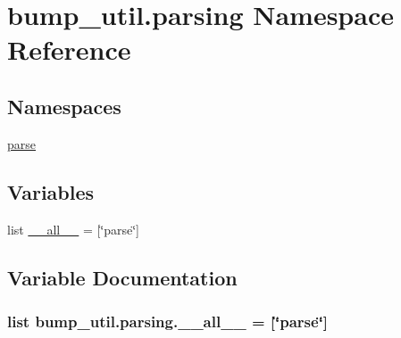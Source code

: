 \hypertarget{namespacebump__util_1_1parsing}{}\section{bump\+\_\+util.\+parsing Namespace Reference}
\label{namespacebump__util_1_1parsing}
\subsection*{Namespaces}
\begin{DoxyCompactItemize}
\item 
 \hyperlink{namespacebump__util_1_1parsing_1_1parse}{parse}
\end{DoxyCompactItemize}
\subsection*{Variables}
\begin{DoxyCompactItemize}
\item 
list \hyperlink{namespacebump__util_1_1parsing_a7eaae042e83d067272095eba9663a230}{\+\_\+\+\_\+all\+\_\+\+\_\+} = \mbox{[}\char`\"{}parse\char`\"{}\mbox{]}
\end{DoxyCompactItemize}


\subsection{Variable Documentation}
\hypertarget{namespacebump__util_1_1parsing_a7eaae042e83d067272095eba9663a230}{}
\subsubsection[{\+\_\+\+\_\+all\+\_\+\+\_\+}]{\setlength{\rightskip}{0pt plus 5cm}list bump\+\_\+util.\+parsing.\+\_\+\+\_\+all\+\_\+\+\_\+ = \mbox{[}\char`\"{}parse\char`\"{}\mbox{]}}\label{namespacebump__util_1_1parsing_a7eaae042e83d067272095eba9663a230}
